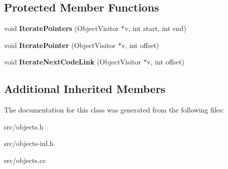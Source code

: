 \subsection*{Protected Member Functions}
\begin{DoxyCompactItemize}
\item 
\hypertarget{classv8_1_1internal_1_1_heap_object_ae43548b5f7944a135386eb7d60c8e034}{}void {\bfseries Iterate\+Pointers} (Object\+Visitor $\ast$v, int start, int end)\label{classv8_1_1internal_1_1_heap_object_ae43548b5f7944a135386eb7d60c8e034}

\item 
\hypertarget{classv8_1_1internal_1_1_heap_object_a92fc60174b53c22f7fdb936d99c1f9a5}{}void {\bfseries Iterate\+Pointer} (Object\+Visitor $\ast$v, int offset)\label{classv8_1_1internal_1_1_heap_object_a92fc60174b53c22f7fdb936d99c1f9a5}

\item 
\hypertarget{classv8_1_1internal_1_1_heap_object_a5d0b164a6ef2debdf573a72894120a45}{}void {\bfseries Iterate\+Next\+Code\+Link} (Object\+Visitor $\ast$v, int offset)\label{classv8_1_1internal_1_1_heap_object_a5d0b164a6ef2debdf573a72894120a45}

\end{DoxyCompactItemize}
\subsection*{Additional Inherited Members}


The documentation for this class was generated from the following files\+:\begin{DoxyCompactItemize}
\item 
src/objects.\+h\item 
src/objects-\/inl.\+h\item 
src/objects.\+cc\end{DoxyCompactItemize}
